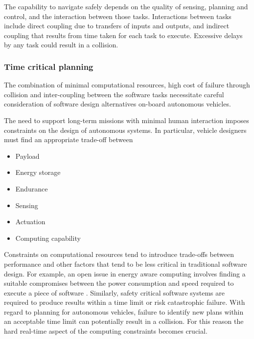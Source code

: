 The capability to navigate safely depends on the quality of sensing, planning and control,
and the interaction between those tasks. Interactions between tasks include direct coupling
due to transfers of inputs and outputs, and indirect coupling that results from time taken for
each task to execute. Excessive delays by any task could result in a collision.


\subsubsection{Time critical planning}
\label{time_critical_planning}

The combination of minimal computational resources, high cost of failure through collision
and inter-coupling between the software tasks necessitate careful consideration of software
design alternatives on-board autonomous vehicles.

The need to support long-term missions with minimal human interaction imposes constraints on the design of autonomous systems. 
In particular, vehicle designers must find an
appropriate trade-off between \cite{Walker2011}

\begin{itemize}
\item Payload
\item Energy storage
\item Endurance
\item Sensing
\item Actuation
\item Computing capability
\end{itemize}

Constraints on computational resources tend to introduce trade-offs between performance
and other factors that tend to be less critical in traditional software design. For example,
an open issue in energy aware computing involves finding a suitable compromises between
the power consumption and speed required to execute a piece of software \cite{Walker2011}.
Similarly, safety critical software systems are required to produce results within a time limit or
risk catastrophic failure. With regard to planning for autonomous vehicles, failure to identify
new plans within an acceptable time limit can potentially result in a collision. For this
reason the hard real-time aspect of the computing constraints becomes crucial.

 
